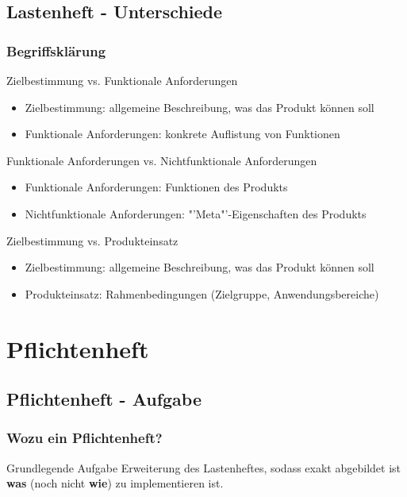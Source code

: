 \documentclass[18pt]{beamer}
\begin{document}
	\subsection{Lastenheft - Unterschiede}
	\begin{frame}
		\frametitle{Begriffsklärung}
		\begin{block}{Zielbestimmung vs. Funktionale Anforderungen}
			\pause
			\begin{itemize}
				\item Zielbestimmung: allgemeine Beschreibung, was das Produkt können soll
				\item Funktionale Anforderungen: konkrete Auflistung von Funktionen
			\end{itemize}
		\end{block}
		\pause
		\begin{block}{Funktionale Anforderungen vs. Nichtfunktionale Anforderungen}
			\pause
			\begin{itemize}
				\item Funktionale Anforderungen: Funktionen des Produkts
				\item Nichtfunktionale Anforderungen: "'Meta"'-Eigenschaften des Produkts
			\end{itemize}
		\end{block}
		\pause
		\begin{block}{Zielbestimmung vs. Produkteinsatz}
			\pause
			\begin{itemize}
				\item Zielbestimmung: allgemeine Beschreibung, was das Produkt können soll
				\item Produkteinsatz: Rahmenbedingungen (Zielgruppe, Anwendungsbereiche)
			\end{itemize}
		\end{block}
	\end{frame}
	
\section{Pflichtenheft}
	\subsection{Pflichtenheft - Aufgabe}
	\begin{frame}
		\frametitle{Wozu ein Pflichtenheft?}
		\begin{block}{Grundlegende Aufgabe}
			Erweiterung des Lastenheftes, sodass exakt abgebildet ist \textbf{was} (noch nicht \textbf{wie}) zu implementieren ist.
		\end{block}
	\end{frame}
	
\end{document}
